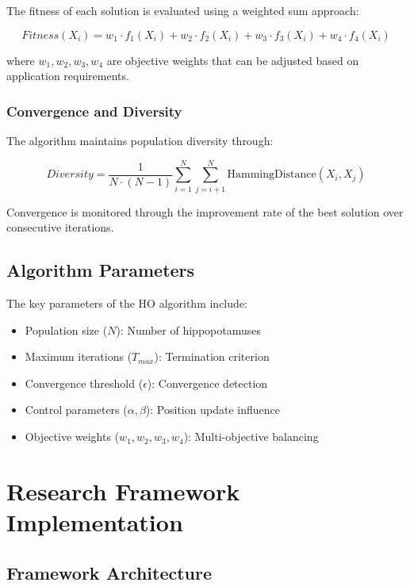 \documentclass[conference]{IEEEtran}
\begin{document}
The fitness of each solution is evaluated using a weighted sum approach:

\begin{equation}
Fitness(X_i) = w_1 \cdot f_1(X_i) + w_2 \cdot f_2(X_i) + w_3 \cdot f_3(X_i) + w_4 \cdot f_4(X_i)
\end{equation}

where $w_1, w_2, w_3, w_4$ are objective weights that can be adjusted based on application requirements.

\subsubsection{Convergence and Diversity}

The algorithm maintains population diversity through:

\begin{equation}
Diversity = \frac{1}{N \cdot (N-1)} \sum_{i=1}^{N} \sum_{j=i+1}^{N} \text{HammingDistance}(X_i, X_j)
\end{equation}

Convergence is monitored through the improvement rate of the best solution over consecutive iterations.

\subsection{Algorithm Parameters}

The key parameters of the HO algorithm include:
\begin{itemize}
    \item Population size ($N$): Number of hippopotamuses
    \item Maximum iterations ($T_{max}$): Termination criterion
    \item Convergence threshold ($\epsilon$): Convergence detection
    \item Control parameters ($\alpha, \beta$): Position update influence
    \item Objective weights ($w_1, w_2, w_3, w_4$): Multi-objective balancing
\end{itemize}

\section{Research Framework Implementation}

\subsection{Framework Architecture}
\end{document}
